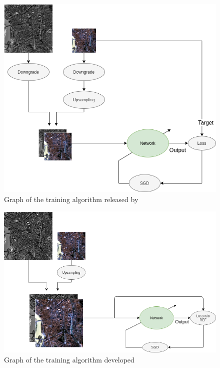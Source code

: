 \documentclass[12pt]{report}
\begin{document}
\begin{figure}[t]
    \centering
    \includegraphics[scale=.35]{RRTraining.png}
    \caption{Graph of the training algorithm released by \cite{pnn}}
    \label{fig:rrtraining}
\end{figure}

\begin{figure}[t]
    \centering
    \includegraphics[scale=.35]{NOREFTraining.png}
    \caption{Graph of the training algorithm developed}
    \label{fig:noreftraining}
\end{figure}
\end{document}
